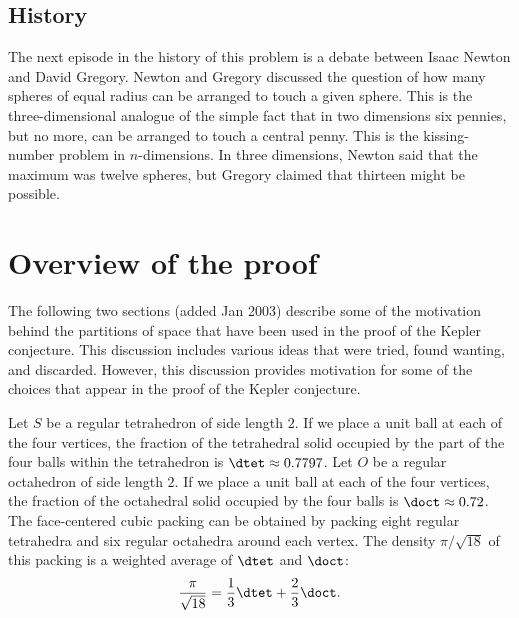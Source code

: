 \section{History}
\label{sec:history}

The next episode in the history of this problem is a debate
between Isaac Newton and David Gregory.  Newton and Gregory
discussed the question of how many spheres of equal radius can be
arranged to touch a given sphere.  This is the three-dimensional
analogue of the simple fact that in two dimensions six pennies,
but no more, can be arranged to touch a central penny.  This is
the kissing-number problem in $n$-dimensions. In three dimensions,
Newton said that the maximum was twelve spheres, but Gregory
claimed that thirteen might be possible.



\chapter{Overview of the proof}


The following two sections (added Jan 2003)  describe some of the
motivation behind the partitions of space that have been used in
the proof of the Kepler conjecture.  This discussion includes
various ideas that were tried, found wanting, and discarded.
However, this discussion provides motivation for some of the
choices that appear in the proof of the Kepler conjecture.

Let $S$ be a regular tetrahedron of side length $2$.  If we place
a unit ball at each of the four vertices, the fraction of the
tetrahedral solid occupied by the part of the four balls within
the tetrahedron is $\dtet\approx 0.7797$. Let $O$ be a regular
octahedron of side length $2$.  If we place a unit ball at each of
the four vertices, the fraction of the octahedral solid occupied
by the four balls is $\doct\approx 0.72$. The face-centered cubic
packing can be obtained by packing eight regular tetrahedra and
six regular octahedra around each vertex. The density
$\pi/\sqrt{18}$ of this packing is a weighted average of $\dtet$
and $\doct$:
    $$\frac\pi{\sqrt{18}} = \frac13\dtet + \frac23\doct.$$
